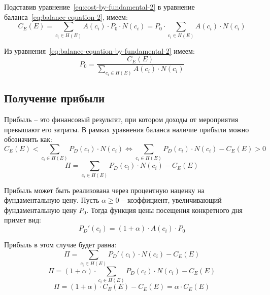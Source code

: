 Подставив уравнение~\ref{eq:cost-by-fundamental-2} в уравнение баланса~\ref{eq:balance-equation-2}, имеем:
\begin{equation}
	C_E(E) = \sum_{c_i \in H(E)}{A(c_i) \cdot P_0 \cdot N(c_i)} = P_0 \cdot \sum_{c_i \in H(E)}{A(c_i) \cdot N(c_i)}
	\label{eq:balance-equation-by-fundamental-2}
\end{equation}

Из уравнения~\ref{eq:balance-equation-by-fundamental-2} имеем:
\begin{equation}
	P_0 = \frac{C_E(E)}{\sum_{c_i \in H(E)}{A(c_i) \cdot N(c_i)}}
	\label{eq:fundamental-price-2}
\end{equation}

\subsection{Получение прибыли}

Прибыль -- это финансовый результат, при котором доходы от мероприятия превышают его затраты. В рамках уравнения баланса наличие прибыли можно обозначить как:
\begin{equation}
	C_E(E) < \sum_{c_i \in H(E)}{P_D(c_i) \cdot N(c_i)} \Leftrightarrow \sum_{c_i \in H(E)}{P_D(c_i) \cdot N(c_i)} - C_E(E) > 0
\end{equation}
\begin{equation}
	\Pi = \sum_{c_i \in H(E)}{P_D(c_i) \cdot N(c_i)} - C_E(E)
\end{equation}

Прибыль может быть реализована через процентную наценку на фундаментальную цену. Пусть $\alpha \ge 0$ -- коэффициент, увеличивающий фундаментальную цену $P_0$. Тогда функция цены посещения конкретного дня примет вид:
\begin{equation}
	P_D'(c_i) = (1 + \alpha) \cdot A(c_i) \cdot P_0
\end{equation}

Прибыль в этом случае будет равна:
\begin{equation}
	\Pi = \sum_{c_i \in H(E)}{P_D'(c_i) \cdot N(c_i)} - C_E(E) 
\end{equation}
\begin{equation}
	\Pi = (1 + \alpha) \cdot \sum_{c_i \in H(E)}{P_D(c_i) \cdot N(c_i)} - C_E(E)
\end{equation}
\begin{equation}
	\Pi = (1 + \alpha) \cdot C_E(E) - C_E(E) = \alpha \cdot C_E(E)
\end{equation}

